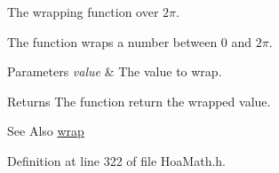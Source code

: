 The wrapping function over $2\pi$. 

The function wraps a number between 0 and $2\pi$.


\begin{DoxyParams}{Parameters}
{\em value} & The value to wrap. \\
\hline
\end{DoxyParams}
\begin{DoxyReturn}{Returns}
The function return the wrapped value.
\end{DoxyReturn}
\begin{DoxySeeAlso}{See Also}
\hyperlink{namespace_hoa_a313552058c836fb832ead703eb1c8ca1}{wrap} 
\end{DoxySeeAlso}


Definition at line 322 of file Hoa\-Math.\-h.

